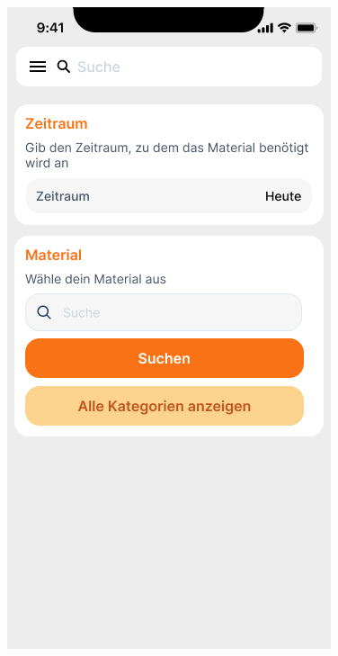 \begin{figure}[h]
    \includegraphics[scale=0.3]{Bilder/Prototyp/Neu/Suche V2.png}\hspace{2em}

\end{figure}
